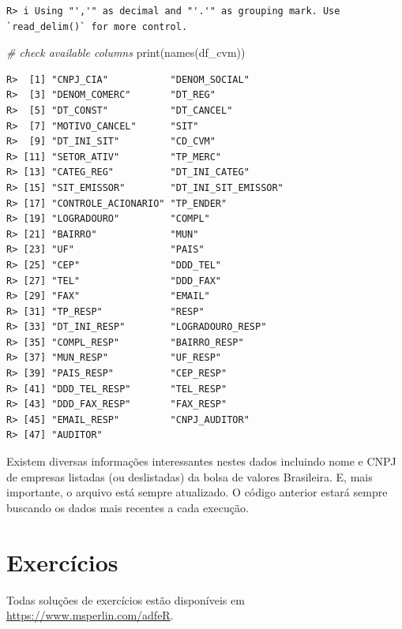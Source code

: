 \documentclass[
  11pt,
]{book}
\newenvironment{Shaded}{\begin{snugshade}}{\end{snugshade}}
\newcommand{\CommentTok}[1]{\textcolor[rgb]{0.37,0.37,0.37}{\textit{#1}}}
\newcommand{\FunctionTok}[1]{\textcolor[rgb]{0,0,0}{#1}}
\newcommand{\NormalTok}[1]{#1}
\begin{document}
\begin{verbatim}
R> i Using "','" as decimal and "'.'" as grouping mark. Use `read_delim()` for more control.
\end{verbatim}

\begin{Shaded}
\begin{Highlighting}[]
\CommentTok{\# check available columns}
\FunctionTok{print}\NormalTok{(}\FunctionTok{names}\NormalTok{(df\_cvm))}
\end{Highlighting}
\end{Shaded}

\begin{verbatim}
R>  [1] "CNPJ_CIA"           "DENOM_SOCIAL"      
R>  [3] "DENOM_COMERC"       "DT_REG"            
R>  [5] "DT_CONST"           "DT_CANCEL"         
R>  [7] "MOTIVO_CANCEL"      "SIT"               
R>  [9] "DT_INI_SIT"         "CD_CVM"            
R> [11] "SETOR_ATIV"         "TP_MERC"           
R> [13] "CATEG_REG"          "DT_INI_CATEG"      
R> [15] "SIT_EMISSOR"        "DT_INI_SIT_EMISSOR"
R> [17] "CONTROLE_ACIONARIO" "TP_ENDER"          
R> [19] "LOGRADOURO"         "COMPL"             
R> [21] "BAIRRO"             "MUN"               
R> [23] "UF"                 "PAIS"              
R> [25] "CEP"                "DDD_TEL"           
R> [27] "TEL"                "DDD_FAX"           
R> [29] "FAX"                "EMAIL"             
R> [31] "TP_RESP"            "RESP"              
R> [33] "DT_INI_RESP"        "LOGRADOURO_RESP"   
R> [35] "COMPL_RESP"         "BAIRRO_RESP"       
R> [37] "MUN_RESP"           "UF_RESP"           
R> [39] "PAIS_RESP"          "CEP_RESP"          
R> [41] "DDD_TEL_RESP"       "TEL_RESP"          
R> [43] "DDD_FAX_RESP"       "FAX_RESP"          
R> [45] "EMAIL_RESP"         "CNPJ_AUDITOR"      
R> [47] "AUDITOR"
\end{verbatim}

Existem diversas informações interessantes nestes dados incluindo nome e CNPJ de empresas listadas (ou deslistadas) da bolsa de valores Brasileira. E, mais importante, o arquivo está sempre atualizado. O código anterior estará sempre buscando os dados mais recentes a cada execução.

\hypertarget{exerc-operacoes-basicas}{%
\section{Exercícios}\label{exerc-operacoes-basicas}}

Todas soluções de exercícios estão disponíveis em \url{https://www.msperlin.com/adfeR}.
\end{document}
